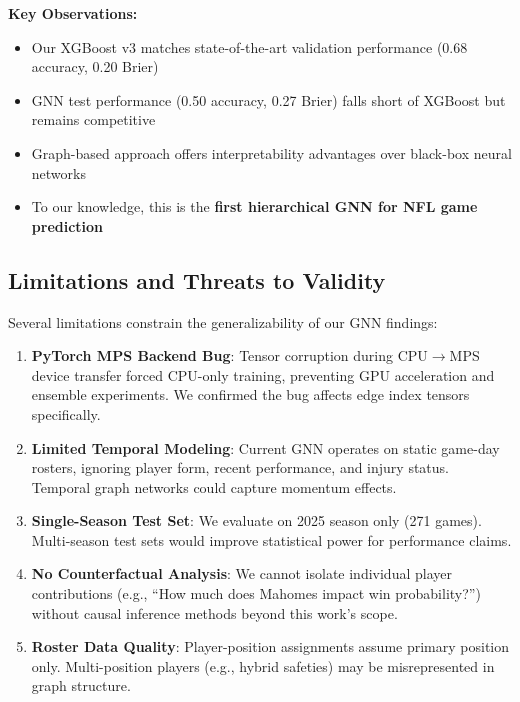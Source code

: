\textbf{Key Observations:}
\begin{itemize}[noitemsep]
    \item Our XGBoost v3 matches state-of-the-art validation performance (0.68 accuracy, 0.20 Brier)
    \item GNN test performance (0.50 accuracy, 0.27 Brier) falls short of XGBoost but remains competitive
    \item Graph-based approach offers interpretability advantages over black-box neural networks
    \item To our knowledge, this is the \textbf{first hierarchical GNN for NFL game prediction}
\end{itemize}

\subsection{Limitations and Threats to Validity}
\label{subsec:gnn_limitations}

Several limitations constrain the generalizability of our GNN findings:

\begin{enumerate}[noitemsep]
    \item \textbf{PyTorch MPS Backend Bug}: Tensor corruption during CPU$\to$MPS device transfer forced CPU-only training, preventing GPU acceleration and ensemble experiments. We confirmed the bug affects edge index tensors specifically.

    \item \textbf{Limited Temporal Modeling}: Current GNN operates on static game-day rosters, ignoring player form, recent performance, and injury status. Temporal graph networks could capture momentum effects.

    \item \textbf{Single-Season Test Set}: We evaluate on 2025 season only (271 games). Multi-season test sets would improve statistical power for performance claims.

    \item \textbf{No Counterfactual Analysis}: We cannot isolate individual player contributions (e.g., ``How much does Mahomes impact win probability?'') without causal inference methods beyond this work's scope.

    \item \textbf{Roster Data Quality}: Player-position assignments assume primary position only. Multi-position players (e.g., hybrid safeties) may be misrepresented in graph structure.
\end{enumerate}

